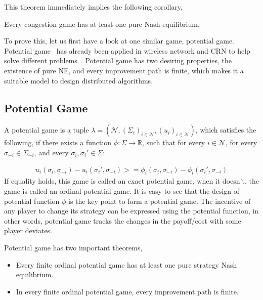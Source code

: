 This theorem immediately implies the following corollary,
\begin{corollary}
\label{background:corollary}
Every congestion game has at least one pure Nash equilibrium.~\cite{Rosenthal}
\end{corollary}

To prove this, let us first have a look at one similar game, potential game.
Potential game~\cite{Mondere_potential_game:1996} has already been applied in wireless network and CRN to help solve different problems~\cite{CApotentialLearning_05dyspan, caps_potential2012, self-coexistenceWRAN2010infocom, pimrc_2012}.
Potential game has two desiring properties, the existence of pure NE, and every improvement path is finite, which makes it a suitable model to design distributed algorithms.


\subsection{Potential Game}

A potential game is a tuple $\lambda=(\mathcal{N},(\Sigma_i)_{i \in \mathcal{N}},(u_i)_{i\in \mathcal{N}})$, which satisfies the following, if there exists a function $\phi: \Sigma\rightarrow \mathbb{R}$, such that for every $i\in \mathcal{N}$, for every $\sigma_{-i}\in \Sigma_{-i}$, and every $\sigma_i, \sigma_i'\in \Sigma$:

\begin{equation}
\label{2:1}
\begin{split}
u_i(\sigma_i, \sigma_{-i})-u_i(\sigma_i', \sigma_{-i}) >= \phi_i(\sigma_i, \sigma_{-i})-\phi_i(\sigma_i', \sigma_{-i})
\end{split}
\end{equation}
If equality holds, this game is called an exact potential game, when it doesn't, the game is called an ordinal potential game.
It is easy to see that the design of potential function $\phi$ is the key point to form a potential game. 
The incentive of any player to change its strategy can be expressed using the potential function, in other words, potential game tracks the changes in the payoff/cost with some player deviates.


Potential game has two important theorems,
\begin{itemize}
\item Every finite ordinal potential game has at least one pure strategy Nash equilibrium.
\item In every finite ordinal potential game, every improvement path is finite.

\end{itemize}

